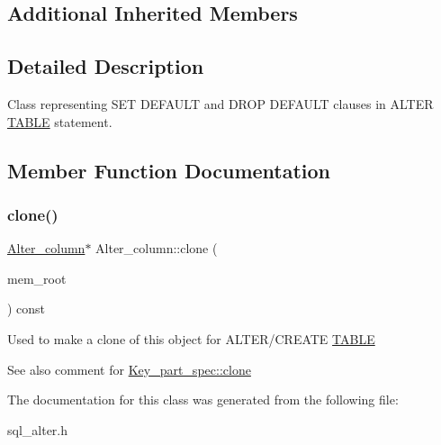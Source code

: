 \subsection*{Additional Inherited Members}


\subsection{Detailed Description}
Class representing S\+ET D\+E\+F\+A\+U\+LT and D\+R\+OP D\+E\+F\+A\+U\+LT clauses in A\+L\+T\+ER \mbox{\hyperlink{structTABLE}{T\+A\+B\+LE}} statement. 

\subsection{Member Function Documentation}
\mbox{\label{classAlter__column_aee34d73a1bc5dd1f8638eb7ffbcad07f}} 
\subsubsection{\texorpdfstring{clone()}{clone()}}
{\footnotesize\ttfamily \mbox{\hyperlink{classAlter__column}{Alter\+\_\+column}}$\ast$ Alter\+\_\+column\+::clone (\begin{DoxyParamCaption}\item[{M\+E\+M\+\_\+\+R\+O\+OT $\ast$}]{mem\+\_\+root }\end{DoxyParamCaption}) const\hspace{0.3cm}{\ttfamily [inline]}}

Used to make a clone of this object for A\+L\+T\+E\+R/\+C\+R\+E\+A\+TE \mbox{\hyperlink{structTABLE}{T\+A\+B\+LE}} \begin{DoxySeeAlso}{See also}
comment for \mbox{\hyperlink{classKey__part__spec_adf40542629144b3dc70f9ae4b4b27c78}{Key\+\_\+part\+\_\+spec\+::clone}} 
\end{DoxySeeAlso}


The documentation for this class was generated from the following file\+:\begin{DoxyCompactItemize}
\item 
sql\+\_\+alter.\+h\end{DoxyCompactItemize}
